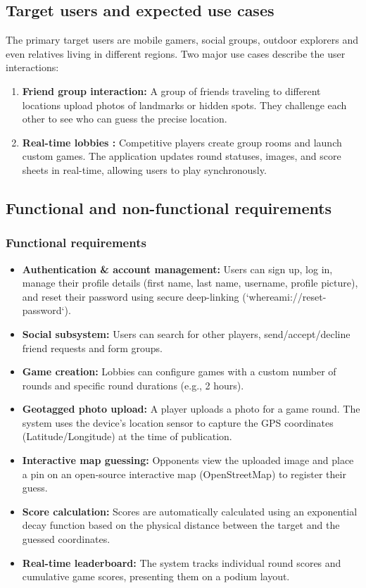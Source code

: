 \documentclass[11pt,a4paper]{article}
\begin{document}
\subsection{Target users and expected use cases}
The primary target users are mobile gamers, social groups, outdoor explorers and even relatives living in different regions. Two major use cases describe the user interactions:
\begin{enumerate}
    \item \textbf{Friend group interaction:} A group of friends traveling to different locations upload photos of landmarks or hidden spots. They challenge each other to see who can guess the precise location.
    \item \textbf{Real-time lobbies :} Competitive players create group rooms and launch custom games. The application updates round statuses, images, and score sheets in real-time, allowing users to play synchronously.
\end{enumerate}

\subsection{Functional and non-functional requirements}
\subsubsection{Functional requirements}
\begin{itemize}
    \item \textbf{Authentication \& account management:} Users can sign up, log in, manage their profile details (first name, last name, username, profile picture), and reset their password using secure deep-linking (`whereami://reset-password`).
    \item \textbf{Social subsystem:} Users can search for other players, send/accept/decline friend requests and form groups.
    \item \textbf{Game creation:} Lobbies can configure games with a custom number of rounds and specific round durations (e.g., 2 hours).
    \item \textbf{Geotagged photo upload:} A player uploads a photo for a game round. The system uses the device's location sensor to capture the GPS coordinates (Latitude/Longitude) at the time of publication.
    \item \textbf{Interactive map guessing:} Opponents view the uploaded image and place a pin on an open-source interactive map (OpenStreetMap) to register their guess.
    \item \textbf{Score calculation:} Scores are automatically calculated using an exponential decay function based on the physical distance between the target and the guessed coordinates.
    \item \textbf{Real-time leaderboard:} The system tracks individual round scores and cumulative game scores, presenting them on a podium layout.
\end{itemize}
\end{document}
